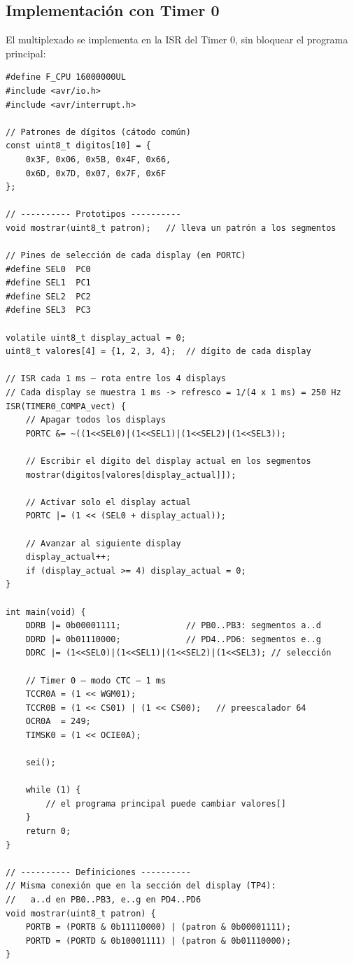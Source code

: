 \subsection{Implementación con Timer 0}

El multiplexado se implementa en la ISR del Timer 0, sin bloquear el programa
principal:

\begin{lstlisting}[style=estilo-c]
#define F_CPU 16000000UL
#include <avr/io.h>
#include <avr/interrupt.h>

// Patrones de dígitos (cátodo común)
const uint8_t digitos[10] = {
    0x3F, 0x06, 0x5B, 0x4F, 0x66,
    0x6D, 0x7D, 0x07, 0x7F, 0x6F
};

// ---------- Prototipos ----------
void mostrar(uint8_t patron);   // lleva un patrón a los segmentos

// Pines de selección de cada display (en PORTC)
#define SEL0  PC0
#define SEL1  PC1
#define SEL2  PC2
#define SEL3  PC3

volatile uint8_t display_actual = 0;
uint8_t valores[4] = {1, 2, 3, 4};  // dígito de cada display

// ISR cada 1 ms — rota entre los 4 displays
// Cada display se muestra 1 ms -> refresco = 1/(4 x 1 ms) = 250 Hz
ISR(TIMER0_COMPA_vect) {
    // Apagar todos los displays
    PORTC &= ~((1<<SEL0)|(1<<SEL1)|(1<<SEL2)|(1<<SEL3));

    // Escribir el dígito del display actual en los segmentos
    mostrar(digitos[valores[display_actual]]);

    // Activar solo el display actual
    PORTC |= (1 << (SEL0 + display_actual));

    // Avanzar al siguiente display
    display_actual++;
    if (display_actual >= 4) display_actual = 0;
}

int main(void) {
    DDRB |= 0b00001111;             // PB0..PB3: segmentos a..d
    DDRD |= 0b01110000;             // PD4..PD6: segmentos e..g
    DDRC |= (1<<SEL0)|(1<<SEL1)|(1<<SEL2)|(1<<SEL3); // selección

    // Timer 0 — modo CTC — 1 ms
    TCCR0A = (1 << WGM01);
    TCCR0B = (1 << CS01) | (1 << CS00);   // preescalador 64
    OCR0A  = 249;
    TIMSK0 = (1 << OCIE0A);

    sei();

    while (1) {
        // el programa principal puede cambiar valores[]
    }
    return 0;
}

// ---------- Definiciones ----------
// Misma conexión que en la sección del display (TP4):
//   a..d en PB0..PB3, e..g en PD4..PD6
void mostrar(uint8_t patron) {
    PORTB = (PORTB & 0b11110000) | (patron & 0b00001111);
    PORTD = (PORTD & 0b10001111) | (patron & 0b01110000);
}
\end{lstlisting}

